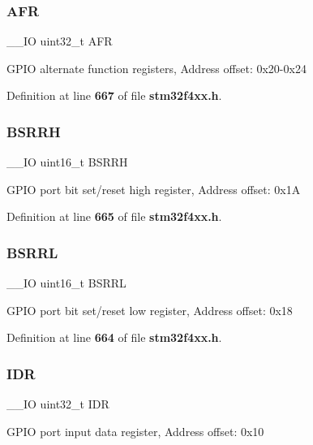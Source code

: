 \subsubsection{A\+FR}
{\footnotesize\ttfamily \+\_\+\+\_\+\+IO uint32\+\_\+t A\+FR}

G\+P\+IO alternate function registers, Address offset\+: 0x20-\/0x24 

Definition at line \textbf{ 667} of file \textbf{ stm32f4xx.\+h}.

\mbox{\label{structGPIO__TypeDef_a35f89f65edca7ed58738166424aeef48}} 
\subsubsection{B\+S\+R\+RH}
{\footnotesize\ttfamily \+\_\+\+\_\+\+IO uint16\+\_\+t B\+S\+R\+RH}

G\+P\+IO port bit set/reset high register, Address offset\+: 0x1A 

Definition at line \textbf{ 665} of file \textbf{ stm32f4xx.\+h}.

\mbox{\label{structGPIO__TypeDef_aa79204c9bcc8c481da0a5ffe7c74d8b0}} 
\subsubsection{B\+S\+R\+RL}
{\footnotesize\ttfamily \+\_\+\+\_\+\+IO uint16\+\_\+t B\+S\+R\+RL}

G\+P\+IO port bit set/reset low register, Address offset\+: 0x18 

Definition at line \textbf{ 664} of file \textbf{ stm32f4xx.\+h}.

\mbox{\label{structGPIO__TypeDef_a328d2fe9ef1d513c3a97d30f98f0047c}} 
\subsubsection{I\+DR}
{\footnotesize\ttfamily \+\_\+\+\_\+\+IO uint32\+\_\+t I\+DR}

G\+P\+IO port input data register, Address offset\+: 0x10 

